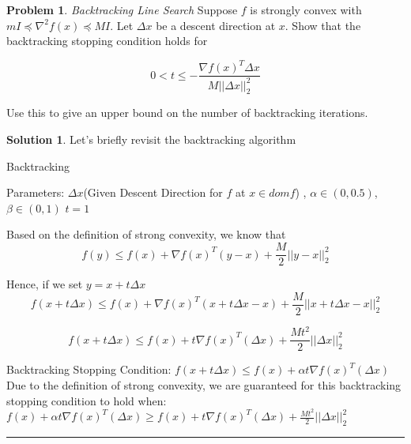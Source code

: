 \documentclass{article}
\theoremstyle{definition}
\newtheorem{problem}{Problem}
\def\fline{\rule{0.75\linewidth}{0.5pt}}
\newcommand{\finishline}{\begin{center}\fline\end{center}}
\newtheorem*{solution*}{Solution}
\newenvironment{solution}{\begin{solution*}}{{\finishline} \end{solution*}}
\begin{document}
\newpage
\begin{problem} \textit{Backtracking Line Search} Suppose $f$ is strongly convex with $mI \preceq \nabla^2f(x) \preceq MI$. Let $\Delta x$ be a descent direction at $x$. Show that the backtracking stopping condition holds for

\begin{equation}
                        \label{eq:example}
                            0 < t \leq -\frac{\nabla f(x)^T \Delta x}{M ||\Delta x||^2_2}
                    \end{equation}

Use this to give an upper bound on the number of backtracking iterations. 

\begin{solution} Let's briefly revisit the backtracking algorithm 

\begin{algorithm}
\caption{Backtracking}
\begin{algorithmic} 
\STATE Parameters: $\Delta x$(Given Descent Direction for $f$ at $x \in dom f$) , $\alpha \in (0, 0.5)$, $\beta \in (0, 1)$
\STATE $t = 1$

\ENDWHILE

\end{algorithmic}
\end{algorithm}

Based on the definition of strong convexity, we know that \newline 
\begin{equation}
    \label{eq:example}
        f(y) \leq f(x) + \nabla f(x)^T (y - x) + \frac{M}{2} ||y - x||^2_2
\end{equation}

Hence, if we set $y = x + t\Delta x$ 
\begin{equation}
    \label{eq:example}
        f(x + t\Delta x) \leq f(x) + \nabla f(x)^T (x + t\Delta x - x) + \frac{M}{2} ||x + t\Delta x - x||^2_2
\end{equation}

\begin{equation}
    \label{eq:example}
        f(x + t\Delta x) \leq f(x) + t\nabla f(x)^T (\Delta x) + \frac{Mt^2}{2} ||\Delta x||^2_2
\end{equation}

Backtracking Stopping Condition: $f(x + t\Delta x) \leq f(x) + \alpha t\nabla f(x)^T (\Delta x)$ \newline 
Due to the definition of strong convexity, we are guaranteed for this backtracking stopping condition to hold when: \newline 
$f(x) + \alpha t\nabla f(x)^T (\Delta x) \geq f(x) + t\nabla f(x)^T (\Delta x) + \frac{Mt^2}{2} ||\Delta x||^2_2$ 


\end{solution}
\end{problem}
\end{document}
